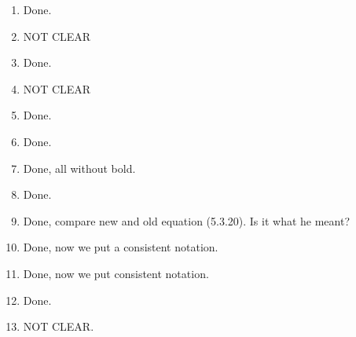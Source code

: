 \documentclass[10pt]{article}
\numberwithin{equation}{section}
\numberwithin{equation}{subsection}
\begin{document}
\begin{enumerate}
			\item Done.
			\item NOT CLEAR
			\item Done.
			\item NOT CLEAR
			\item Done.
			\item Done.
			\item Done, all without bold.
			\item Done.
			\item Done, compare new and old equation (5.3.20). Is it what he meant?
			\item Done, now we put a consistent notation.
			\item Done, now we put consistent notation.
			\item Done.
			\item NOT CLEAR.
		\end{enumerate}
	
\end{document}

